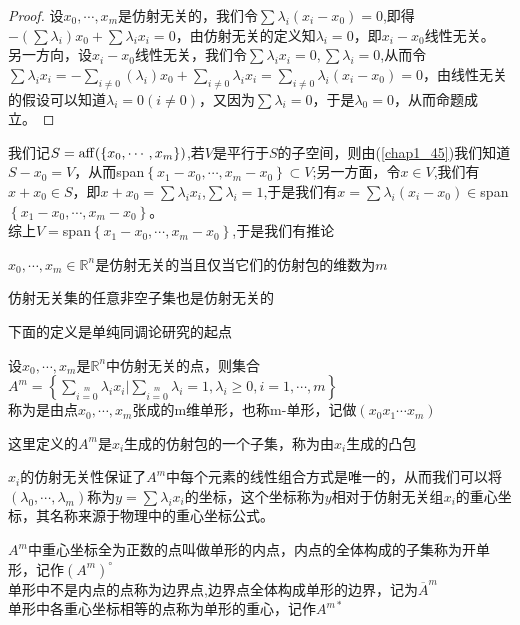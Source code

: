 \begin{proof}
设$x_{0},\cdots,x_{m}$是仿射无关的，我们令$\sum\lambda_{i}(x_{i}-x_{0})=0$,即得$-(\sum\lambda_{i})x_{0}+\sum\lambda_{i}x_{i}=0$，由仿射无关的定义知$\lambda_{i}=0$，即$x_{i}-x_{0}$线性无关。\\
另一方向，设$x_{i}-x_{0}$线性无关，我们令$\sum\lambda_{i}x_{i}=0,\sum\lambda_{i}=0$,从而令$\sum\lambda_{i}x_{i}=-\sum\limits_{i\neq0}(\lambda_{i})x_{0}+\sum\limits_{i\neq0}\lambda_{i}x_{i}=\sum\limits_{i\neq0}\lambda_{i}(x_{i}-x_{0})=0$，由线性无关的假设可以知道$\lambda_{i}=0(i\neq0)$，又因为$\sum\lambda_{i}=0$，于是$\lambda_{0}=0$，从而命题成立。
\end{proof}
我们记$S={\rm aff}(\left\{x_{0},\cdots,x_{m}\right\})$,若$V$是平行于$S$的子空间，则由(\ref{chap1_45})我们知道$S-x_{0}=V$，从而span$\left\{x_{1}-x_{0},\cdots,x_{m}-x_{0}\right\}\subset V$;另一方面，令$x\in V$,我们有$x+x_{0}\in S$，即$x+x_{0}=\sum\lambda_{i}x_{i}$,$\sum\lambda_{i}=1$,于是我们有$x=\sum\lambda_{i}(x_{i}-x_{0})\in$span$\left\{x_{1}-x_{0},\cdots,x_{m}-x_{0}\right\}$。\\
综上$V=$span$\left\{x_{1}-x_{0},\cdots,x_{m}-x_{0}\right\}$,于是我们有推论
\begin{corollary}
$x_{0},\cdots,x_{m}\in\mathbb{R}^{n}$是仿射无关的当且仅当它们的仿射包的维数为$m$
\end{corollary}
\begin{corollary}
仿射无关集的任意非空子集也是仿射无关的
\end{corollary}
下面的定义是单纯同调论研究的起点
\begin{definition}[m-单形]
设$x_{0},\cdots,x_{m}$是$\mathbb{R}^{n}$中仿射无关的点，则集合\\
$A^{m}=\left\{\sum\limits_{i=0}\limits^{m}\lambda_{i}x_{i}|\sum\limits_{i=0}\limits^{m}\lambda_{i}=1,\lambda_{i}\geq0,i=1,\cdots,m\right\}$\\称为是由点$x_{0},\cdots,x_{m}$张成的m维单形，也称m-单形，记做$(x_{0}x_{1}\cdots x_{m})$
\end{definition}
\begin{remark}
这里定义的$A^{m}$是$x_{i}$生成的仿射包的一个子集，称为由$x_{i}$生成的凸包
\end{remark}
\begin{remark}
$x_{i}$的仿射无关性保证了$A^{m}$中每个元素的线性组合方式是唯一的，从而我们可以将$(\lambda_{0},\cdots,\lambda_{m})$称为$y=\sum\lambda_{i}x_{i}$的坐标，这个坐标称为$y$相对于仿射无关组$x_{i}$的重心坐标，其名称来源于物理中的重心坐标公式。
\end{remark}
\begin{definition}
$A^{m}$中重心坐标全为正数的点叫做单形的内点，内点的全体构成的子集称为开单形，记作$({A}^{m})^{\circ}$\\
单形中不是内点的点称为边界点,边界点全体构成单形的边界，记为$\overline{A}^{m}$\\
单形中各重心坐标相等的点称为单形的重心，记作$A^{m*}$
\end{definition}
